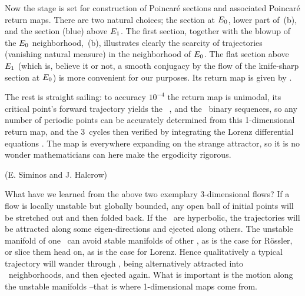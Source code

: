 {Now the stage is set for construction of  Poincar\'e sections
and associated  Poincar\'e return maps. There are two natural
choices; the section at $E_{0}$, lower part of
\,(b), and the section (blue) above
$E_{1}$. The first section, together with the blowup of
the $E_{0}$ neighborhood, \,(b),
illustrates clearly the scarcity of trajectories (vanishing
natural measure) in the neighborhood of $E_{0}$. The flat
section above $E_{1}$ (which is, believe it or not, a
smooth conjugacy by the flow of the knife-sharp section at
$E_{0}$) is more convenient for our purposes. Its return
map   is given by .

The rest is straight sailing: to accuracy $10^{-4}$ the return
map is unimodal, its critical point's forward trajectory
yields the \ks\ , and the \admissible\ binary
sequences, so any number of periodic points  can be accurately
determined from this 1-dimensional return map, and the 3\dmn\
cycles then verified by integrating the Lorenz differential
equations . The map is everywhere expanding on
the strange attractor, so it is no wonder mathematicians can
here make the ergodicity rigorous.

\hfill   (E. Siminos and J. Halcrow)
    } %

What have we learned from the above two exemplary 3-dimensional
flows? If a flow is locally unstable but globally bounded, any
open ball of initial points will be stretched out and then
folded back. If the \eqva\ are hyperbolic, the trajectories
will be attracted along some eigen-directions and ejected along
others. The unstable manifold of one \eqv\ can avoid stable
manifolds of other \eqva, as is the case for R\"ossler, or
slice them head on, as is the case for Lorenz. Hence
qualitatively a typical trajectory will wander through
\statesp, being alternatively attracted into \eqva\
neighborhoods, and then ejected again. What is important is the
motion along the unstable manifolds --that is where
1-dimensional maps come from.


  \Remarks

